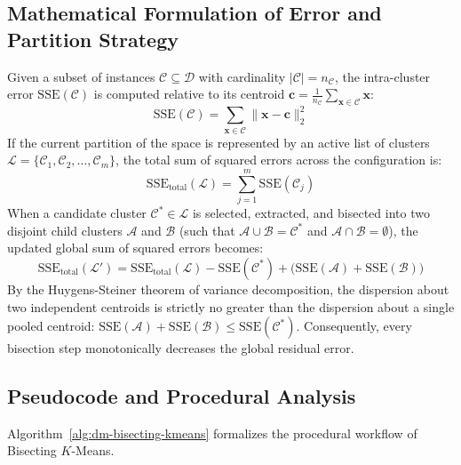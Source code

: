 \subsection{Mathematical Formulation of Error and Partition Strategy}

Given a subset of instances $\mathcal{C} \subseteq \mathcal{D}$ with cardinality $|\mathcal{C}| = n_{\mathcal{C}}$, the intra-cluster error $\mathrm{SSE}(\mathcal{C})$ is computed relative to its centroid $\mathbf{c} = \frac{1}{n_{\mathcal{C}}} \sum_{\mathbf{x} \in \mathcal{C}} \mathbf{x}$:
\begin{equation}
\label{eq:dm-sse-single-cluster}
\mathrm{SSE}(\mathcal{C}) = \sum_{\mathbf{x} \in \mathcal{C}} \|\mathbf{x} - \mathbf{c}\|_2^2
\end{equation}
If the current partition of the space is represented by an active list of clusters $\mathcal{L} = \{\mathcal{C}_1, \mathcal{C}_2, \dots, \mathcal{C}_m\}$, the total sum of squared errors across the configuration is:
\begin{equation}
\label{eq:dm-sse-total-list}
\mathrm{SSE}_{\text{total}}(\mathcal{L}) = \sum_{j=1}^m \mathrm{SSE}(\mathcal{C}_j)
\end{equation}
When a candidate cluster $\mathcal{C}^* \in \mathcal{L}$ is selected, extracted, and bisected into two disjoint child clusters $\mathcal{A}$ and $\mathcal{B}$ (such that $\mathcal{A} \cup \mathcal{B} = \mathcal{C}^*$ and $\mathcal{A} \cap \mathcal{B} = \emptyset$), the updated global sum of squared errors becomes:
\begin{equation}
\label{eq:dm-sse-split-delta}
\mathrm{SSE}_{\text{total}}(\mathcal{L}') = \mathrm{SSE}_{\text{total}}(\mathcal{L}) - \mathrm{SSE}(\mathcal{C}^*) + \big( \mathrm{SSE}(\mathcal{A}) + \mathrm{SSE}(\mathcal{B}) \big)
\end{equation}
By the Huygens-Steiner theorem of variance decomposition, the dispersion about two independent centroids is strictly no greater than the dispersion about a single pooled centroid: $\mathrm{SSE}(\mathcal{A}) + \mathrm{SSE}(\mathcal{B}) \le \mathrm{SSE}(\mathcal{C}^*)$. Consequently, every bisection step monotonically decreases the global residual error.

\subsection{Pseudocode and Procedural Analysis}

Algorithm~\ref{alg:dm-bisecting-kmeans} formalizes the procedural workflow of Bisecting $K$-Means.

